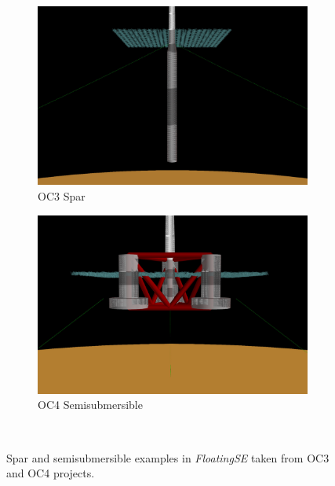 \begin{figure}[htb]
  \begin{subfigure}[b]{0.49\linewidth}
    \centering \includegraphics[width=\linewidth]{figs/spar-initial.pdf}
    \caption{OC3 Spar}
  \end{subfigure}
  \begin{subfigure}[b]{0.49\linewidth}
    \centering \includegraphics[width=\linewidth]{figs/semi-initial.pdf}
    \caption{OC4 Semisubmersible}
  \end{subfigure}\\
  \caption{Spar and semisubmersible examples in \textit{FloatingSE} taken from
    OC3\citep{OC3} and OC4\citep{OC4} projects.}
  \label{fig:initial}
\end{figure}

